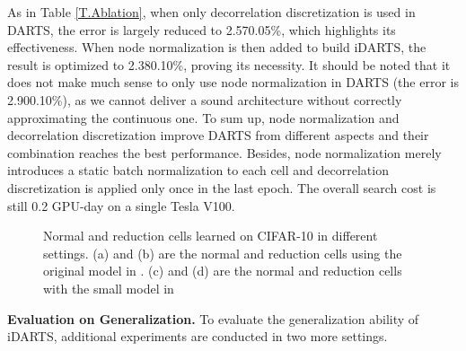 \documentclass[journal]{IEEEtran}
\begin{document}
As in Table \ref{T.Ablation}, when only decorrelation discretization is used in DARTS, the error is largely reduced to 2.570.05\%, which highlights its effectiveness. When node normalization is then added to build iDARTS, the result is optimized to 2.380.10\%, proving its necessity. It should be noted that it does not make much sense to only use node normalization in DARTS (the error is 2.900.10\%), as we cannot deliver a sound architecture without correctly approximating the continuous one. To sum up, node normalization and decorrelation discretization improve DARTS from different aspects and their combination reaches the best performance. Besides, node normalization merely introduces a static batch normalization to each cell and decorrelation discretization is applied only once in the last epoch. The overall search cost is still 0.2 GPU-day on a single Tesla V100. 



\begin{figure*}[!htbp]
   \caption{Normal and reduction cells learned on CIFAR-10 in different settings. (a) and (b) are the normal and reduction cells using the original model in . (c) and (d) are the normal and reduction cells with the small model in }
\label{fig:S1}
\end{figure*}




\label{EXP.Gen}
\textbf{Evaluation on Generalization.} To evaluate the generalization ability of iDARTS, additional experiments are conducted in two more settings.
\end{document}
